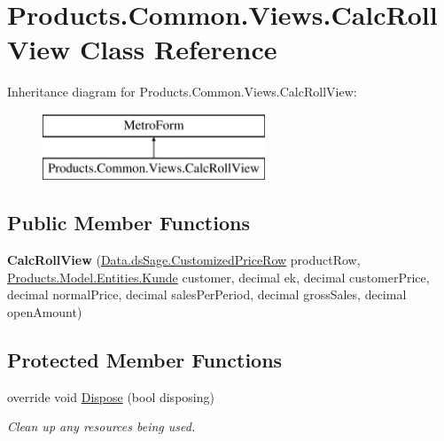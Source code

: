 \hypertarget{class_products_1_1_common_1_1_views_1_1_calc_roll_view}{}\section{Products.\+Common.\+Views.\+Calc\+Roll\+View Class Reference}
\label{class_products_1_1_common_1_1_views_1_1_calc_roll_view}
Inheritance diagram for Products.\+Common.\+Views.\+Calc\+Roll\+View\+:\begin{figure}[H]
\begin{center}
\leavevmode
\includegraphics[height=2.000000cm]{class_products_1_1_common_1_1_views_1_1_calc_roll_view}
\end{center}
\end{figure}
\subsection*{Public Member Functions}
\begin{DoxyCompactItemize}
\item 
{\bfseries Calc\+Roll\+View} (\hyperlink{class_products_1_1_data_1_1ds_sage_1_1_customized_price_row}{Data.\+ds\+Sage.\+Customized\+Price\+Row} product\+Row, \hyperlink{class_products_1_1_model_1_1_entities_1_1_kunde}{Products.\+Model.\+Entities.\+Kunde} customer, decimal ek, decimal customer\+Price, decimal normal\+Price, decimal sales\+Per\+Period, decimal gross\+Sales, decimal open\+Amount)\hypertarget{class_products_1_1_common_1_1_views_1_1_calc_roll_view_a3630ab862a15e5da309ddb2dfb5e6c5f}{}\label{class_products_1_1_common_1_1_views_1_1_calc_roll_view_a3630ab862a15e5da309ddb2dfb5e6c5f}

\end{DoxyCompactItemize}
\subsection*{Protected Member Functions}
\begin{DoxyCompactItemize}
\item 
override void \hyperlink{class_products_1_1_common_1_1_views_1_1_calc_roll_view_a217be041173c032192fc056ae43f31f0}{Dispose} (bool disposing)
\begin{DoxyCompactList}\small\item\em Clean up any resources being used. \end{DoxyCompactList}\end{DoxyCompactItemize}


